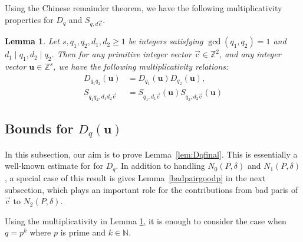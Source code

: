 \documentclass[letterpaper,11pt]{amsart}
\numberwithin{equation}{section}
\newtheorem{lemma}[theorem]{Lemma}
\theoremstyle{definition}
\numberwithin{equation}{section}
\newcommand{\ZZ}{\mathbb{Z}}
\newcommand{\NN}{\mathbb{N}}
\newcommand{\uu}{\mathbf{u}}
\newcommand{\uc}{{\vec{\mathrm{c}}}}
\begin{document}
Using the Chinese remainder theorem, we have the following multiplicativity properties for $D_q$ and $S_{q, d\uc}$. 
\begin{lemma}\label{lem:multiplicative}
Let $s, q_1,q_2, d_1, d_2\geq 1$ be integers satisfying $\gcd(q_1,q_2)=1$ and $d_1\mid q_1, d_2\mid q_2$. Then for any primitive integer vector $\uc\in\ZZ^2$, and any integer vector $\uu\in \ZZ^s$, we have the following multiplicativity relations:
\begin{align*}
D_{q_1q_2}(\uu)&=D_{q_1}(\uu)D_{q_2}(\uu),%
\\
S_{q_1q_2,d_1d_2\uc}&=S_{q_1,d_1\uc}(\uu)S_{q_2,d_2\uc}(\uu)%
\end{align*}
\end{lemma}


\subsection{Bounds for $D_q(\uu)$} In this subsection, our aim is to prove Lemma~\ref{lem:Dqfinal}. This is essentially a well-known estimate for for $D_q$. In addition to handling $N_0(P,\delta)$ and $N_1(P,\delta)$, a special case of this result is gives Lemma~\ref{badpairgoodp} in the next subsection, which plays an important role for the contributions from bad paris of $\uc$ to $N_2(P,\delta)$.

Using the multiplicativity in Lemma \ref{lem:multiplicative}, it is enough to consider the case when $q=p^k$ where $p$ is prime and $k\in \NN$.
  
\end{document}
